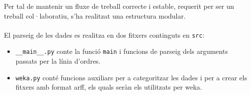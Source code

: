 
Per tal de mantenir un fluxe de treball correcte i estable, requerit per ser un treball col·laboratiu, s'ha realitzat una estructura modular.\\
\\
El parseig de les dades es realitza en dos fitxers continguts en \texttt{src}:
\begin{itemize}
	\item \verb|__main__.py| conte la funció \texttt{main} i funcions de parseig dels
	arguments passats per la línia d'ordres.
	\item \texttt{weka.py} conté funcions auxiliars per a categoritzar les dades i per a crear els
	fitxers amb format arff, els quals seràn els utilitzats per weka.
\end{itemize}
